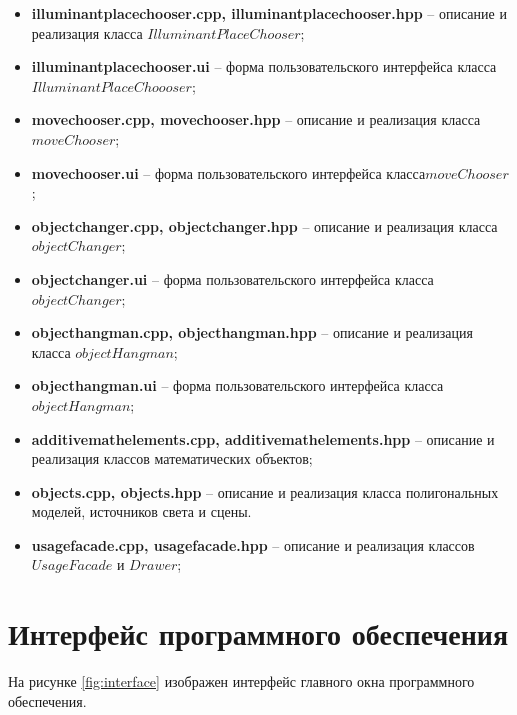 \documentclass[a4paper,14pt, unknownkeysallowed]{extreport}
\begin{document}
\begin{itemize}
	\item \textbf{illuminantplacechooser.cpp, illuminantplacechooser.hpp} -- описание и реализация класса $IlluminantPlaceChooser$;
	\item \textbf{illuminantplacechooser.ui} -- форма пользовательского интерфейса класса $IlluminantPlaceChoooser$;
	\item \textbf{movechooser.cpp, movechooser.hpp} -- описание и реализация класса\linebreak $moveChooser$;
	\item \textbf{movechooser.ui} -- форма пользовательского интерфейса класса\linebreak $moveChooser$;
	\item \textbf{objectchanger.cpp, objectchanger.hpp} -- описание и реализация класса $objectChanger$;
	\item \textbf{objectchanger.ui} -- форма пользовательского интерфейса класса\linebreak $objectChanger$;
	\item \textbf{objecthangman.cpp, objecthangman.hpp} -- описание и реализация класса $objectHangman$;
	\item \textbf{objecthangman.ui} -- форма пользовательского интерфейса класса\linebreak $objectHangman$;
	\item \textbf{additivemathelements.cpp, additivemathelements.hpp} -- описание и реализация классов математических объектов;
	\item \textbf{objects.cpp, objects.hpp} -- описание и реализация класса полигональных моделей, источников света и сцены.
	\item \textbf{usagefacade.cpp, usagefacade.hpp} -- описание и реализация классов $UsageFacade$ и $Drawer$;
\end{itemize}

\section{Интерфейс программного обеспечения}

На рисунке \ref{fig:interface} изображен интерфейс главного окна программного обеспечения.
\end{document}
